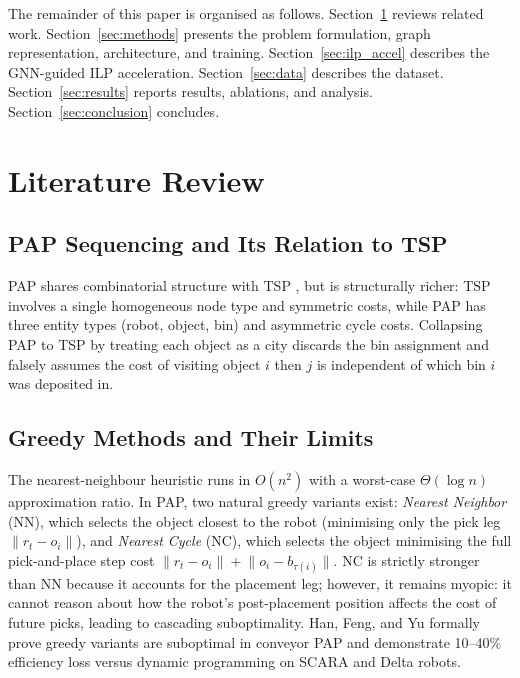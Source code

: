 \documentclass[conference]{IEEEtran}
\begin{document}
The remainder of this paper is organised as follows. Section~\ref{sec:lit} reviews related work. Section~\ref{sec:methods} presents the problem formulation, graph representation, architecture, and training. Section~\ref{sec:ilp_accel} describes the GNN-guided ILP acceleration. Section~\ref{sec:data} describes the dataset. Section~\ref{sec:results} reports results, ablations, and analysis. Section~\ref{sec:conclusion} concludes.

\section{Literature Review}\label{sec:lit}

\subsection{PAP Sequencing and Its Relation to TSP}

PAP shares combinatorial structure with TSP \cite{dantzig1954}, but is structurally richer: TSP involves a single homogeneous node type and symmetric costs, while PAP has three entity types (robot, object, bin) and asymmetric cycle costs. Collapsing PAP to TSP by treating each object as a city discards the bin assignment and falsely assumes the cost of visiting object $i$ then $j$ is independent of which bin $i$ was deposited in.

\subsection{Greedy Methods and Their Limits}

The nearest-neighbour heuristic \cite{rosenkrantz1977} runs in $O(n^2)$ with a worst-case $\Theta(\log n)$ approximation ratio. In PAP, two natural greedy variants exist: \emph{Nearest Neighbor} (NN), which selects the object closest to the robot (minimising only the pick leg $\lVert r_t - o_i \rVert$), and \emph{Nearest Cycle} (NC), which selects the object minimising the full pick-and-place step cost $\lVert r_t - o_i \rVert + \lVert o_i - b_{\tau(i)} \rVert$. NC is strictly stronger than NN because it accounts for the placement leg; however, it remains myopic: it cannot reason about how the robot's post-placement position affects the cost of future picks, leading to cascading suboptimality. Han, Feng, and Yu \cite{han2019pap} formally prove greedy variants are suboptimal in conveyor PAP and demonstrate 10--40\% efficiency loss versus dynamic programming on SCARA and Delta robots.
\end{document}
